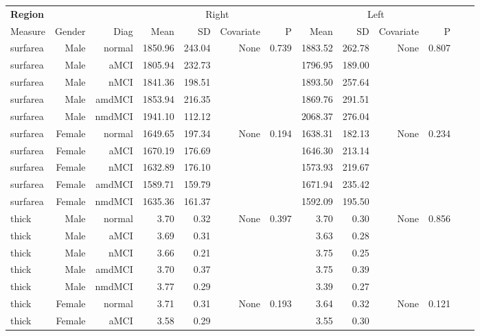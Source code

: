 \documentclass[12pt]{article}
\newcommand\T{\rule{0pt}{2.6ex}}
\newcommand\B{\rule[-1.2ex]{0pt}{0pt}}
\begin{document}
  \newpage
\begin{sidewaystable}
  \centering
  \footnotesize
  \begin{tabular}{l|rr|rrrr|rrrr|rr}
	\hline
	\textbf{Region} & & & \multicolumn{4}{c}{Right} \T & \multicolumn{4}{|c}{Left} & & \\
	\multicolumn{1}{l|}{Measure} \T\B & Gender & Diag & Mean & SD & Covariate & P & Mean & SD & Covariate & P \\
	\hline\hline
 surfarea & Male & normal & 1850.96 & 243.04 & None & 0.739 & 1883.52 & 262.78 & None & 0.807 \\ 
  surfarea & Male & aMCI & 1805.94 & 232.73 &  &  & 1796.95 & 189.00 &  &  \\ 
  surfarea & Male & nMCI & 1841.36 & 198.51 &  &  & 1893.50 & 257.64 &  &  \\ 
  surfarea & Male & amdMCI & 1853.94 & 216.35 &  &  & 1869.76 & 291.51 &  &  \\ 
  surfarea & Male & nmdMCI & 1941.10 & 112.12 &  &  & 2068.37 & 276.04 &  &  \\ 
   \hline
surfarea & Female & normal & 1649.65 & 197.34 & None & 0.194 & 1638.31 & 182.13 & None & 0.234 \\ 
  surfarea & Female & aMCI & 1670.19 & 176.69 &  &  & 1646.30 & 213.14 &  &  \\ 
  surfarea & Female & nMCI & 1632.89 & 176.10 &  &  & 1573.93 & 219.67 &  &  \\ 
  surfarea & Female & amdMCI & 1589.71 & 159.79 &  &  & 1671.94 & 235.42 &  &  \\ 
  surfarea & Female & nmdMCI & 1635.36 & 161.37 &  &  & 1592.09 & 195.50 &  &  \\ 
   \hline
thick & Male & normal & 3.70 & 0.32 & None & 0.397 & 3.70 & 0.30 & None & 0.856 \\ 
  thick & Male & aMCI & 3.69 & 0.31 &  &  & 3.63 & 0.28 &  &  \\ 
  thick & Male & nMCI & 3.66 & 0.21 &  &  & 3.75 & 0.25 &  &  \\ 
  thick & Male & amdMCI & 3.70 & 0.37 &  &  & 3.75 & 0.39 &  &  \\ 
  thick & Male & nmdMCI & 3.77 & 0.29 &  &  & 3.39 & 0.27 &  &  \\ 
   \hline
thick & Female & normal & 3.71 & 0.31 & None & 0.193 & 3.64 & 0.32 & None & 0.121 \\ 
  thick & Female & aMCI & 3.58 & 0.29 &  &  & 3.55 & 0.30 &  &  \\ 

\end{tabular}
\end{sidewaystable}
\end{document}
